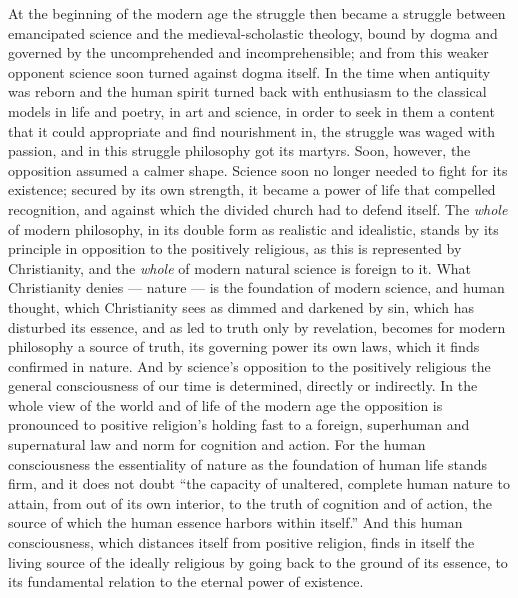 \documentclass[12pt,a4paper,openany]{book}
\newcommand{\opage}[1]{\marginnote{\footnotesize\textit{[#1]}}}
\begin{document}
At the beginning of the modern age the struggle then became a
struggle between emancipated science and the medieval-scholastic
theology, bound by dogma and governed by the uncomprehended
and incomprehensible; and from this weaker
opponent science soon turned against dogma itself.
In the time when antiquity was reborn and the human spirit
turned back with enthusiasm to the classical models in life and
poetry, in art and science, in order to seek in them a content
that it could appropriate and find nourishment in, the struggle was
waged with passion, and in this struggle philosophy got its
martyrs. Soon, however, the opposition assumed a calmer
shape. Science soon no longer needed to fight
for its existence; secured by its own strength, it became a
power of life that compelled recognition, and against which
the divided church had to defend itself. The \emph{whole} of modern
philosophy, in its double form as realistic and idealistic,
stands by its principle in opposition to the positively religious,
as this is represented by Christianity, and
the \emph{whole} of modern natural science is foreign to it. What
Christianity denies --- nature --- is the foundation of modern science,
and human thought, which Christianity
sees as dimmed and darkened by sin, which has disturbed
its essence, and as led to truth only by revelation,
becomes for modern philosophy a source of truth,
its governing power its own laws, which it finds confirmed
in nature. And by science's opposition to
\opage{293}the positively religious the general consciousness of our time
is determined, directly or indirectly. In the whole view of the world and of life
of the modern age the opposition is pronounced
to positive religion's holding fast to a foreign, superhuman
and supernatural law and norm for cognition
and action. For the human consciousness the essentiality of nature
as the foundation of human life stands firm, and it
does not doubt ``the capacity of unaltered, complete human nature
to attain, from out of its own interior, to the truth of cognition
and of action, the source of which the human essence
harbors within itself.'' And this human consciousness, which distances
itself from positive religion, finds in itself the
living source of the ideally religious by going back to the ground of its essence,
to its fundamental relation to the eternal power of existence.
\end{document}
